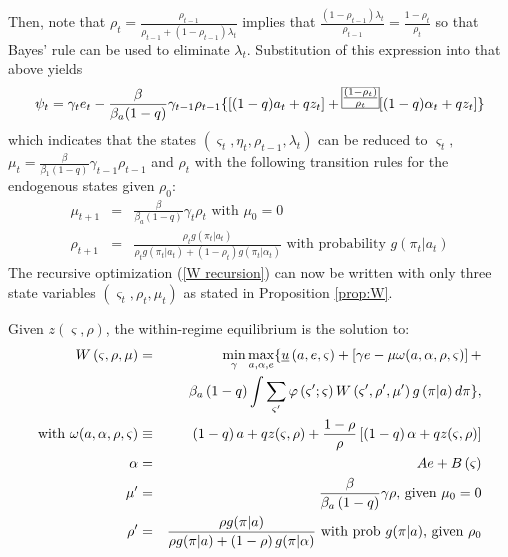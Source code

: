 \documentclass[12pt,letter,leqno]{article}
\theoremstyle{asn}
\theoremstyle{lem}
\theoremstyle{slem}
\theoremstyle{prop}
\theoremstyle{appprop}
\theoremstyle{rem}
\theoremstyle{defn}
\begin{document}
Then, note that $\rho _{t}=\frac{\rho _{t-1}}{\rho _{t-1}+(1-\rho
_{t-1})\lambda _{t}}$ implies that $
\frac{(1-\rho _{t-1})\lambda _{t}}{\rho _{t-1}}=\frac{1-\rho _{t}}{\rho _{t}}$ 
so that Bayes' rule can be used to eliminate $\lambda _{t}$.
Substitution of this expression into that above yields%
\begin{equation}
\psi _{t}=\gamma_{t}e_{t}-\frac{\beta }{\beta_{a}(1-q)}\gamma _{t-1}\rho
_{t-1}\{[(1-q)a_{t}+qz_{t}]+\frame{$\frac{(1-\rho _{t})}{\rho _{t}}$}%
[(1-q)\alpha _{t}+qz_{t}]\}  \label{part of w (version 2)}
\end{equation}%
which indicates that the states $(\varsigma _{t},\eta _{t},\rho _{t-1},\lambda
_{t})$ can be reduced to $\varsigma _{t},$ $\mu _{t}=\frac{\beta }{\beta
_{1}(1-q)}\gamma _{t-1}\rho _{t-1}$ and $\rho _{t}$ with the following transition rules for the endogenous states given $\rho_{0}$:
\begin{eqnarray}
\mu _{t+1}&=&\frac{\beta }{\beta_{a}(1-q)}\gamma _{t}\rho _{t} \text{ with } \mu_{0}=0 \label{app:mu}\\
\rho _{t+1}&=&\frac{\rho_tg(\pi_t|a_t)}{\rho_tg(\pi_t|a_t)+(1-\rho_t)g(\pi_t|\alpha_t)} \text{ with probability $g(\pi_t |a_t)$} \label{app:rho}
\end{eqnarray}
The recursive optimization (\ref{W recursion}) can now be written with only three state variables $(\varsigma_t,\rho_t,\mu_t)$ as stated in Proposition \ref{prop:W}.
\begin{appprop}\label{prop:Wapp}%
Given $z(\varsigma ,\rho)$, the within-regime equilibrium is the solution to:
\begin{eqnarray}
W\left( \varsigma ,\rho ,\mu \right) &=&\min_{\gamma }\max_{a,\alpha
,e}\{\underline{u}\left( a,e,\varsigma \right) +\left[ \gamma e -\mu \omega(a,\alpha,\rho,\varsigma)
\right] +  \label{app:W} \\
&&\beta_{a}\left( 1-q\right) \int \sum_{\varsigma ^{\prime }}\varphi \left(
\varsigma ^{\prime };\varsigma \right) W\left( \varsigma ^{\prime },\rho
^{\prime },\mu ^{\prime }\right) g\left( \pi |a\right) d\pi \}, \notag \\
\text{with } \omega(a,\alpha,\rho,\varsigma) &\equiv& \left( 1-q\right) a+qz(\varsigma ,\rho)+\frac{1-\rho }{%
\rho }\left[ \left( 1-q\right) \alpha +qz (\varsigma ,\rho)\right]  \label{appomega} \\
\alpha &=& Ae+B\left( \varsigma \right) \\
\mu ^{\prime } &=&\frac{\beta }{\beta_{a}\left( 1-q\right) }\gamma \rho 
\text{, given }\mu _{0}=0  \label{mup} \\
\rho ^{\prime } &=&\frac{\rho g(\pi|a) }{\rho g(\pi|a) +\left( 1-\rho
\right) g(\pi|\alpha)} \text{ with prob $g(\pi|a)$, given $\rho_0$}  \label{rhop}
\end{eqnarray}
\end{appprop}%
\end{document}
